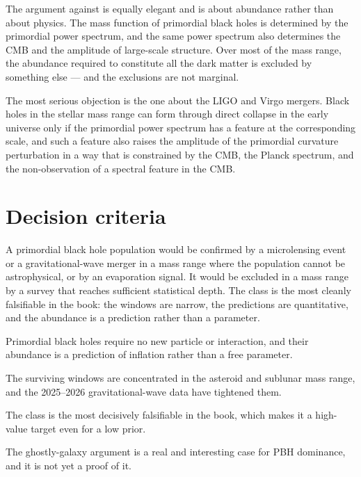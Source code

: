 The argument against is equally elegant and is about abundance rather than
about physics. The mass function of primordial black holes is determined by
the primordial power spectrum, and the same power spectrum also determines
the CMB and the amplitude of large-scale structure. Over most of the mass
range, the abundance required to constitute all the dark matter is excluded
by something else --- and the exclusions are not marginal.

The most serious objection is the one about the LIGO and Virgo mergers.
Black holes in the stellar mass range can form through direct collapse in
the early universe only if the primordial power spectrum has a feature at
the corresponding scale, and such a feature also raises the amplitude of
the primordial curvature perturbation in a way that is constrained by the
CMB, the Planck spectrum, and the non-observation of a spectral feature in
the CMB.

\section{Decision criteria}A primordial black hole population would be
confirmed by a microlensing event or a gravitational-wave merger in a mass
range where the population cannot be astrophysical, or by an evaporation
signal. It would be excluded in a mass range by a survey that reaches
sufficient statistical depth. The class is the most cleanly falsifiable in
the book: the windows are narrow, the predictions are quantitative, and
the abundance is a prediction rather than a parameter.

\begin{keytakeaways}
\item Primordial black holes require no new particle or interaction, and
their abundance is a prediction of inflation rather than a free parameter.
\item The surviving windows are concentrated in the asteroid and sublunar
mass range, and the 2025--2026 gravitational-wave data have tightened them.
\item The class is the most decisively falsifiable in the book, which makes
it a high-value target even for a low prior.
\item The ghostly-galaxy argument is a real and interesting case for PBH
dominance, and it is not yet a proof of it.
\end{keytakeaways}
